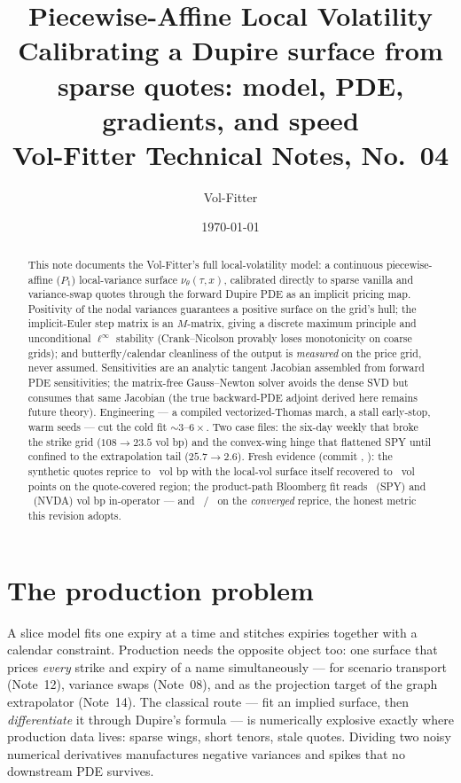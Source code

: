 \documentclass[11pt]{article}
\title{\textbf{Piecewise-Affine Local Volatility}\\[2pt]
\large Calibrating a Dupire surface from sparse quotes: model, PDE, gradients, and speed\\[2pt]
\normalsize Vol-Fitter Technical Notes, No.~04}
\author{Vol-Fitter}
\date{\today}
\begin{document}
\maketitle


\begin{abstract}
This note documents the Vol-Fitter's full local-volatility model: a continuous
piecewise-affine ($P_1$) local-variance surface $\nu_\theta(\tau,x)$,
calibrated directly to sparse vanilla and variance-swap quotes through the
forward Dupire PDE as an implicit pricing map. Positivity of the nodal
variances guarantees a positive surface on the grid's hull; the implicit-Euler
step matrix is an $M$-matrix, giving a discrete maximum principle and
unconditional $\ell^\infty$ stability (Crank--Nicolson provably loses
monotonicity on coarse grids); and butterfly/calendar cleanliness of the
output is \emph{measured} on the price grid, never assumed. Sensitivities are
an analytic tangent Jacobian assembled from forward PDE sensitivities; the
matrix-free Gauss--Newton solver avoids the dense SVD but consumes that same
Jacobian (the true backward-PDE adjoint derived here remains future theory).
Engineering --- a compiled vectorized-Thomas march, a stall early-stop, warm
seeds --- cut the cold fit $\sim3$--$6\times$. Two case files: the six-day
weekly that broke the strike grid ($108\to23.5$ vol bp) and the convex-wing
hinge that flattened SPY until confined to the extrapolation tail
($25.7\to2.6$). Fresh evidence (commit \texttt{\lvgencommit}, \lvgendate):
the synthetic quotes reprice to \lvrtmaxerr\ vol bp with the local-vol
surface itself recovered to \lvrtsurfmax\ vol points on the quote-covered
region; the product-path Bloomberg fit reads \lvspyrms\ (SPY) and
\lvnvdarms\ (NVDA) vol bp in-operator --- and \lvspyconv\ / \lvnvdaconv\ on
the \emph{converged} reprice, the honest metric this revision adopts.
\end{abstract}

\newpage
\tableofcontents
\newpage

\section{The production problem}
\label{sec:problem}

A slice model fits one expiry at a time and stitches expiries together with a
calendar constraint. Production needs the opposite object too: one surface that
prices \emph{every} strike and expiry of a name simultaneously --- for
scenario transport (Note~12), variance swaps (Note~08), and as the projection
target of the graph extrapolator (Note~14). The classical route --- fit an
implied surface, then \emph{differentiate} it through Dupire's formula --- is
numerically explosive exactly where production data lives: sparse wings, short
tenors, stale quotes. Dividing two noisy numerical derivatives manufactures
negative variances and spikes that no downstream PDE survives.
\end{document}
